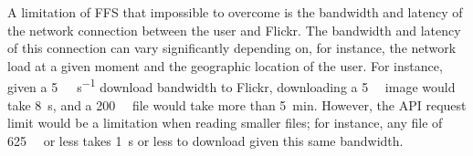 A limitation of \gls{FFS} that impossible to overcome is the bandwidth and latency of the network connection between the user and Flickr. The bandwidth and latency of this connection can vary significantly depending on, for instance, the network load at a given moment and the geographic location of the user. For instance, given a \SI[per-mode = symbol]{5}{\mega\bit\per\second} download bandwidth to Flickr, downloading a \SI[per-mode = symbol]{5}{\mega\byte} image would take \SI[per-mode = symbol]{8}{\second}, and a \SI[per-mode = symbol]{200}{\mega\byte} file would take more than \SI[per-mode = symbol]{5}{\minute}. However, the \gls{API} request limit would be a limitation when reading smaller files; for instance, any file of \SI[per-mode = symbol]{625}{\kilo\byte} or less takes \SI[per-mode = symbol]{1}{\second} or less to download given this same bandwidth. 

%
